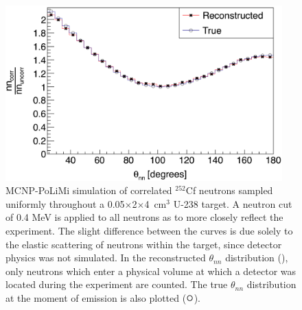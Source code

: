 \begin{figure}
    \centering
    \includegraphics[width = 0.95\textwidth]{Content/Errors/EffectOfElasticScattering.png}
    \caption{
    MCNP-PoLiMi simulation of correlated $^{252}$Cf neutrons sampled uniformly throughout a 0.05$\times$2$\times$4~cm$^3$ U-238 target.
    A neutron cut of 0.4 MeV is applied to all neutrons as to more closely reflect the experiment.
    The slight difference between the curves is due solely to the elastic scattering of neutrons within the target, since detector physics was not simulated.
    In the reconstructed $\theta_{nn}$ distribution ({\tiny {}}), only neutrons which enter a physical volume at which a detector was located during the experiment are counted.
   The true $\theta_{nn}$ distribution at the moment of emission is also plotted ($\mathlarger{\mathlarger{\mathlarger{\circ}}}$).
    }
    \label{fig:ElasticScatteringEffect}
\end{figure}